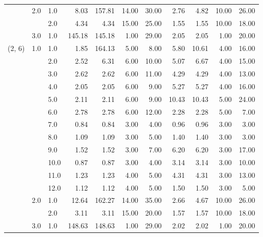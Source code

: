 \begin{tabular}{lllrrrrrrrr}
       & 2.0 & 1.0  &       8.03 &    157.81 & 14.00 &  30.00 &       2.76 &      4.82 & 10.00 &  26.00 \\
       &     & 2.0  &       4.34 &      4.34 & 15.00 &  25.00 &       1.55 &      1.55 & 10.00 &  18.00 \\
       & 3.0 & 1.0  &     145.18 &    145.18 &  1.00 &  29.00 &       2.05 &      2.05 &  1.00 &  20.00 \\
(2, 6) & 1.0 & 1.0  &       1.85 &    164.13 &  5.00 &   8.00 &       5.80 &     10.61 &  4.00 &  16.00 \\
       &     & 2.0  &       2.52 &      6.31 &  6.00 &  10.00 &       5.07 &      6.67 &  4.00 &  15.00 \\
       &     & 3.0  &       2.62 &      2.62 &  6.00 &  11.00 &       4.29 &      4.29 &  4.00 &  13.00 \\
       &     & 4.0  &       2.05 &      2.05 &  6.00 &   9.00 &       5.27 &      5.27 &  4.00 &  16.00 \\
       &     & 5.0  &       2.11 &      2.11 &  6.00 &   9.00 &      10.43 &     10.43 &  5.00 &  24.00 \\
       &     & 6.0  &       2.78 &      2.78 &  6.00 &  12.00 &       2.28 &      2.28 &  5.00 &   7.00 \\
       &     & 7.0  &       0.84 &      0.84 &  3.00 &   4.00 &       0.96 &      0.96 &  3.00 &   3.00 \\
       &     & 8.0  &       1.09 &      1.09 &  3.00 &   5.00 &       1.40 &      1.40 &  3.00 &   3.00 \\
       &     & 9.0  &       1.52 &      1.52 &  3.00 &   7.00 &       6.20 &      6.20 &  3.00 &  17.00 \\
       &     & 10.0 &       0.87 &      0.87 &  3.00 &   4.00 &       3.14 &      3.14 &  3.00 &  10.00 \\
       &     & 11.0 &       1.23 &      1.23 &  4.00 &   5.00 &       4.31 &      4.31 &  3.00 &  13.00 \\
       &     & 12.0 &       1.12 &      1.12 &  4.00 &   5.00 &       1.50 &      1.50 &  3.00 &   5.00 \\
       & 2.0 & 1.0  &      12.64 &    162.27 & 14.00 &  35.00 &       2.66 &      4.67 & 10.00 &  26.00 \\
       &     & 2.0  &       3.11 &      3.11 & 15.00 &  20.00 &       1.57 &      1.57 & 10.00 &  18.00 \\
       & 3.0 & 1.0  &     148.63 &    148.63 &  1.00 &  29.00 &       2.02 &      2.02 &  1.00 &  20.00 \\

\end{tabular}
